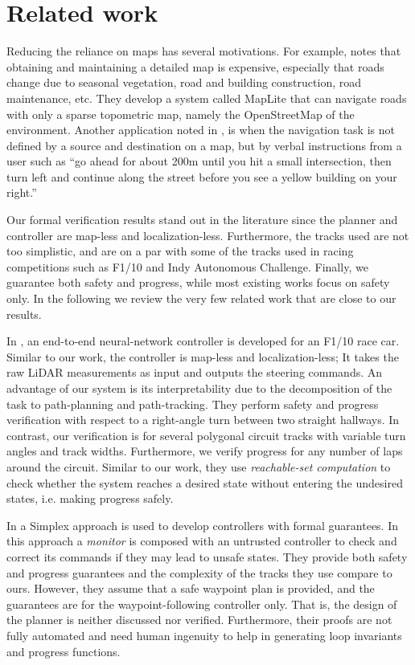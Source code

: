 \section{Related work}
\label{sec:relwork}
Reducing the reliance on maps has several motivations.
%
For example, \cite{Ort.2019} notes that 
obtaining and maintaining a detailed map is expensive, especially that roads change due to seasonal vegetation, road and building construction, road maintenance, etc.
%
They develop a system called MapLite that can navigate roads with only a sparse topometric map, namely the OpenStreetMap of the environment.
%
Another application noted in \cite{Vasudevan.2021}, \cite{Deruyttere.2019} is when the navigation task is not defined by a source and destination on a map, but by verbal instructions from a user such as ``go ahead for about 200m until you hit a small intersection, then turn left and continue along the street before you see a yellow building on your right.''


Our formal verification results stand out in the literature since the planner and controller are map-less and localization-less.
%
Furthermore, the tracks used are not too simplistic, and are on a par with some of the tracks used in racing competitions such as F1/10 and Indy Autonomous Challenge.
%
Finally, we guarantee both safety and progress, while most existing works focus on safety only.
%
In the following we review the very few related work that are close to our results.


In \cite{Ivanov.2020, Ivanov-verifying.2020}, an end-to-end neural-network controller is developed for an F1/10 race car.
%
Similar to our work, the controller is map-less and localization-less;
%
It takes the raw LiDAR measurements as input and outputs the steering commands.
%
An advantage of our system is its interpretability due to the decomposition of the task to path-planning and path-tracking.
%
They perform safety and progress verification with respect to a right-angle turn between two straight hallways.
%
In contrast, our verification is for several polygonal circuit tracks with variable turn angles and track widths.
%
Furthermore, we verify progress for any number of laps around the circuit.
%
Similar to our work, they use \emph{reachable-set computation} to check whether the system reaches a desired state without entering the undesired states, i.e. making progress safely.



In \cite{Bohrer.2019} a Simplex approach \cite{Seto.1998} is used to develop controllers with formal guarantees.
%
In this approach a \emph{monitor} is composed with an untrusted controller to check and correct its commands if they may lead to unsafe states.
%
They provide both safety and progress guarantees and the complexity of the tracks they use compare to ours.
%
However, they assume that a safe waypoint plan is provided, and the guarantees are for the waypoint-following controller only.
%
That is, the design of the planner is neither discussed nor verified.
%
Furthermore, their proofs are not fully automated and need human ingenuity to help in generating loop invariants and progress functions.

